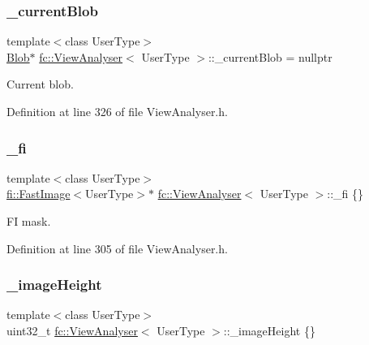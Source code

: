 \subsubsection{\texorpdfstring{\+\_\+current\+Blob}{\_currentBlob}}
{\footnotesize\ttfamily template$<$class User\+Type$>$ \\
\hyperlink{classfc_1_1Blob}{Blob}$\ast$ \hyperlink{classfc_1_1ViewAnalyser}{fc\+::\+View\+Analyser}$<$ User\+Type $>$\+::\+\_\+current\+Blob = nullptr\hspace{0.3cm}{\ttfamily [private]}}



Current blob. 



Definition at line 326 of file View\+Analyser.\+h.

\mbox{\label{classfc_1_1ViewAnalyser_af9c2ea795ef1ead56c962847995044a1}} 
\subsubsection{\texorpdfstring{\+\_\+fi}{\_fi}}
{\footnotesize\ttfamily template$<$class User\+Type$>$ \\
\hyperlink{classfi_1_1FastImage}{fi\+::\+Fast\+Image}$<$User\+Type$>$$\ast$ \hyperlink{classfc_1_1ViewAnalyser}{fc\+::\+View\+Analyser}$<$ User\+Type $>$\+::\+\_\+fi \{\}\hspace{0.3cm}{\ttfamily [private]}}



FI mask. 



Definition at line 305 of file View\+Analyser.\+h.

\mbox{\label{classfc_1_1ViewAnalyser_a3df970fce554953cdf16d8ca79bd1f69}} 
\subsubsection{\texorpdfstring{\+\_\+image\+Height}{\_imageHeight}}
{\footnotesize\ttfamily template$<$class User\+Type$>$ \\
uint32\+\_\+t \hyperlink{classfc_1_1ViewAnalyser}{fc\+::\+View\+Analyser}$<$ User\+Type $>$\+::\+\_\+image\+Height \{\}\hspace{0.3cm}{\ttfamily [private]}}



